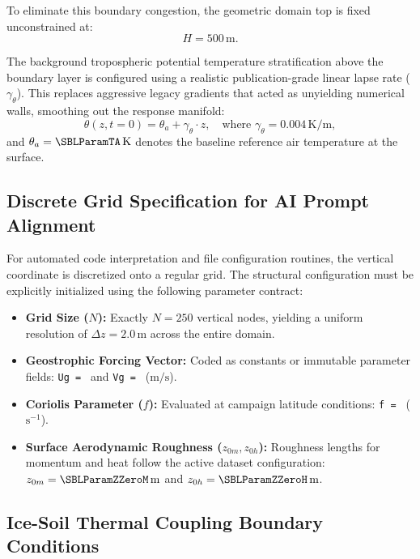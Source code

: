 \documentclass[11pt,letterpaper]{article}
\begin{document}
To eliminate this boundary congestion, the geometric domain top is fixed unconstrained at:
\begin{equation}
H = 500\,\mathrm{m}.
\label{eq:domain_top}
\end{equation}

The background tropospheric potential temperature stratification above the boundary layer is configured using a realistic publication-grade linear lapse rate ($\gamma_\theta$). This replaces aggressive legacy gradients that acted as unyielding numerical walls, smoothing out the response manifold:
\begin{equation}
	\theta(z, t=0) = \theta_a + \gamma_\theta \cdot z, \quad \text{where } \gamma_\theta = 0.004\,\mathrm{K/m},
\label{eq:lapse_rate}
\end{equation}
and $\theta_a = \SBLParamTA\,\mathrm{K}$ denotes the baseline reference air temperature at the surface.

\subsection{Discrete Grid Specification for AI Prompt Alignment}
\label{subsec:discrete_grid_spec}

For automated code interpretation and file configuration routines, the vertical coordinate is discretized onto a regular grid. The structural configuration must be explicitly initialized using the following parameter contract:

\begin{itemize}
    \item \textbf{Grid Size ($N$):} Exactly $N = 250$ vertical nodes, yielding a uniform resolution of $\Delta z = 2.0\,\mathrm{m}$ across the entire domain.
    \item \textbf{Geostrophic Forcing Vector:} Coded as constants or immutable parameter fields: \texttt{Ug = \SBLParamUG} and \texttt{Vg = \SBLParamVG} ($\mathrm{m/s}$).
    \item \textbf{Coriolis Parameter ($f$):} Evaluated at campaign latitude conditions: \texttt{f = \SBLParamFCoriolis} ($\mathrm{s}^{-1}$).
    \item \textbf{Surface Aerodynamic Roughness ($z_{0m}, z_{0h}$):} Roughness lengths for momentum and heat follow the active dataset configuration: $z_{0m} = \SBLParamZZeroM\,\mathrm{m}$ and $z_{0h} = \SBLParamZZeroH\,\mathrm{m}$.
\end{itemize}

\subsection{Ice-Soil Thermal Coupling Boundary Conditions}
\label{subsec:surface_coupling}
\end{document}
